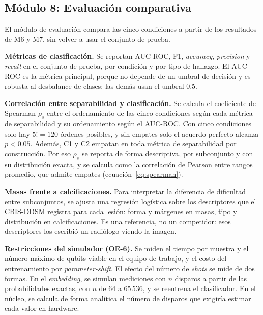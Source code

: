 
\subsection{Módulo 8: Evaluación comparativa}

El módulo de evaluación compara las cinco condiciones a partir de los resultados de M6 y M7, sin
volver a usar el conjunto de prueba.

\textbf{Métricas de clasificación.} Se reportan AUC-ROC, F1, \textit{accuracy}, \textit{precision}
y \textit{recall} en el conjunto de prueba, por condición y por tipo de hallazgo. El AUC-ROC es la
métrica principal, porque no depende de un umbral de decisión y es robusta al desbalance de clases;
las demás usan el umbral 0.5.

\textbf{Correlación entre separabilidad y clasificación.} Se calcula el coeficiente de Spearman
$\rho_s$ entre el ordenamiento de las cinco condiciones según cada métrica de separabilidad y su
ordenamiento según el AUC-ROC. Con cinco condiciones solo hay $5! = 120$ órdenes posibles, y sin
empates solo el acuerdo perfecto alcanza $p < 0.05$. Además, C1 y C2 empatan en toda métrica de
separabilidad por construcción. Por eso $\rho_s$ se reporta de forma descriptiva, por subconjunto y
con su distribución exacta, y se calcula como la correlación de Pearson entre rangos promedio, que
admite empates (ecuación~\eqref{eq:spearman}).

\textbf{Masas frente a calcificaciones.} Para interpretar la diferencia de dificultad entre
subconjuntos, se ajusta una regresión logística sobre los descriptores que el CBIS-DDSM registra
para cada lesión: forma y márgenes en masas, tipo y distribución en calcificaciones. Es una
referencia, no un competidor: esos descriptores los escribió un radiólogo viendo la imagen.

\textbf{Restricciones del simulador (OE-6).} Se miden el tiempo por muestra y el número máximo de
qubits viable en el equipo de trabajo, y el costo del entrenamiento por \textit{parameter-shift}. El
efecto del número de \textit{shots} se mide de dos formas. En el \textit{embedding}, se simulan
mediciones con $n$ disparos a partir de las probabilidades exactas, con $n$ de 64 a 65\,536, y se
reentrena el clasificador. En el núcleo, se calcula de forma analítica el número de disparos que
exigiría estimar cada valor en hardware.
